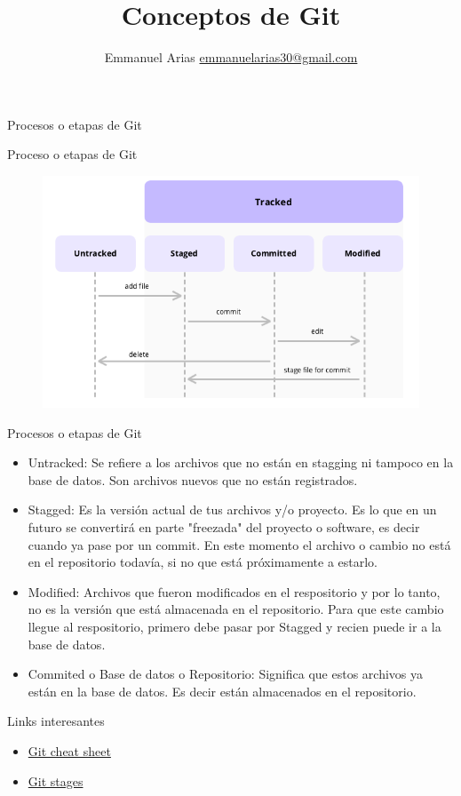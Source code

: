 \documentclass{beamer}
\title{Conceptos de Git}
\author{Emmanuel Arias \href{mailto:emmanuelarias30@gmail.com}{emmanuelarias30@gmail.com}}
\date{}
\begin{document}
\begin{frame}[plain]
    \maketitle
\end{frame}

\begin{frame}
	\Huge Procesos o etapas de Git
\end{frame}

\begin{frame}{Proceso o etapas de Git}
	\begin{figure}
		\centering
		\includegraphics[width=1\linewidth]{img/stages}
		\label{fig:stages}
	\end{figure}
\end{frame}

\begin{frame}{Procesos o etapas de Git}
\begin{itemize}
	\item Untracked: Se refiere a los archivos que no están en stagging ni tampoco en la base de datos. Son archivos nuevos que no están registrados.
	\item Stagged: Es la versión actual de tus archivos y/o proyecto. Es lo que en un futuro se convertirá en parte "freezada" del proyecto o software, es decir cuando ya pase por un commit.
	En este momento el archivo o cambio no está en el repositorio todavía, si no que está próximamente a estarlo.
\end{itemize}
\end{frame}

\begin{frame}
	 \begin{itemize}
		\item Modified: Archivos que fueron modificados en el respositorio y por lo tanto, no es la versión que está almacenada en el repositorio. Para que este cambio llegue al respositorio, primero debe pasar por Stagged y recien puede ir a la base de datos.
	 	\item Commited o Base de datos o  Repositorio: Significa que estos archivos ya están en la base de datos. Es decir están almacenados en el repositorio.
	 \end{itemize}
\end{frame}

\begin{frame}[plain]{Links interesantes}
	\begin{itemize}
		\item \href{https://www.bitdegree.org/learn/git-cheat-sheet}{Git cheat sheet}
		\item \href{https://almasumfahim.com/git-stages/}{Git stages}
	\end{itemize}
\end{frame}
\end{document}
